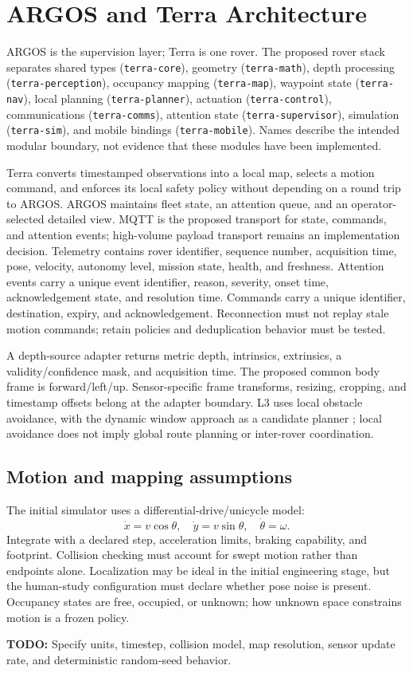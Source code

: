 \documentclass[12pt,oneside]{report}
\newcommand{\todo}[1]{\par\noindent\textcolor{red!65!black}{\textbf{TODO:} #1}\par}
\begin{document}
\chapter{ARGOS and Terra Architecture}
ARGOS is the supervision layer; Terra is one rover. The proposed rover stack separates shared types (\texttt{terra-core}), geometry (\texttt{terra-math}), depth processing (\texttt{terra-perception}), occupancy mapping (\texttt{terra-map}), waypoint state (\texttt{terra-nav}), local planning (\texttt{terra-planner}), actuation (\texttt{terra-control}), communications (\texttt{terra-comms}), attention state (\texttt{terra-supervisor}), simulation (\texttt{terra-sim}), and mobile bindings (\texttt{terra-mobile}). Names describe the intended modular boundary, not evidence that these modules have been implemented.

Terra converts timestamped observations into a local map, selects a motion command, and enforces its local safety policy without depending on a round trip to ARGOS. ARGOS maintains fleet state, an attention queue, and an operator-selected detailed view. MQTT is the proposed transport for state, commands, and attention events; high-volume payload transport remains an implementation decision. Telemetry contains rover identifier, sequence number, acquisition time, pose, velocity, autonomy level, mission state, health, and freshness. Attention events carry a unique event identifier, reason, severity, onset time, acknowledgement state, and resolution time. Commands carry a unique identifier, destination, expiry, and acknowledgement. Reconnection must not replay stale motion commands; retain policies and deduplication behavior must be tested.

A depth-source adapter returns metric depth, intrinsics, extrinsics, a validity/confidence mask, and acquisition time. The proposed common body frame is forward/left/up. Sensor-specific frame transforms, resizing, cropping, and timestamp offsets belong at the adapter boundary. L3 uses local obstacle avoidance, with the dynamic window approach as a candidate planner \citep{fox1997dwa}; local avoidance does not imply global route planning or inter-rover coordination.

\section{Motion and mapping assumptions}
The initial simulator uses a differential-drive/unicycle model:
\[\dot{x}=v\cos\theta,\quad\dot{y}=v\sin\theta,\quad\dot{\theta}=\omega.\]
Integrate with a declared step, acceleration limits, braking capability, and footprint. Collision checking must account for swept motion rather than endpoints alone. Localization may be ideal in the initial engineering stage, but the human-study configuration must declare whether pose noise is present. Occupancy states are free, occupied, or unknown; how unknown space constrains motion is a frozen policy. \todo{Specify units, timestep, collision model, map resolution, sensor update rate, and deterministic random-seed behavior.}
\end{document}

